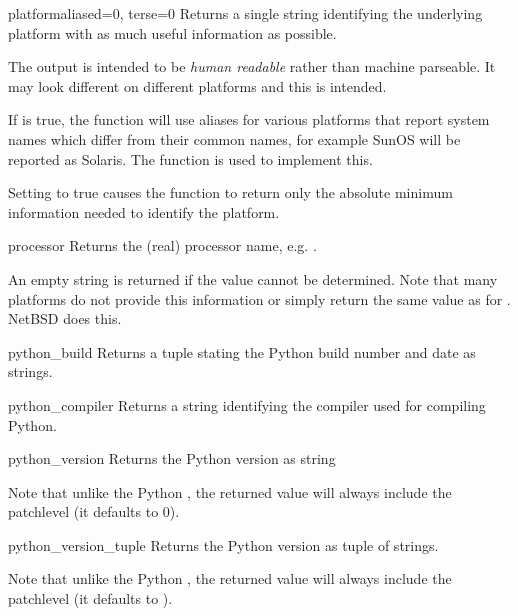 \begin{funcdesc}{platform}{aliased=0, terse=0}
  Returns a single string identifying the underlying platform
  with as much useful information as possible.

  The output is intended to be \emph{human readable} rather than
  machine parseable. It may look different on different platforms and
  this is intended.

  If  is true, the function will use aliases for various
  platforms that report system names which differ from their common
  names, for example SunOS will be reported as Solaris.  The
   function is used to implement this.

  Setting  to true causes the function to return only the
  absolute minimum information needed to identify the platform.
\end{funcdesc}

\begin{funcdesc}{processor}{}
  Returns the (real) processor name, e.g. .

  An empty string is returned if the value cannot be determined. Note
  that many platforms do not provide this information or simply return
  the same value as for .  NetBSD does this.
\end{funcdesc}

\begin{funcdesc}{python_build}{}
  Returns a tuple  stating the
  Python build number and date as strings.
\end{funcdesc}

\begin{funcdesc}{python_compiler}{}
  Returns a string identifying the compiler used for compiling Python.
\end{funcdesc}

\begin{funcdesc}{python_version}{}
  Returns the Python version as string 

  Note that unlike the Python , the returned value
  will always include the patchlevel (it defaults to 0).
\end{funcdesc}

\begin{funcdesc}{python_version_tuple}{}
  Returns the Python version as tuple  of strings.

  Note that unlike the Python , the returned value
  will always include the patchlevel (it defaults to ).
\end{funcdesc}

